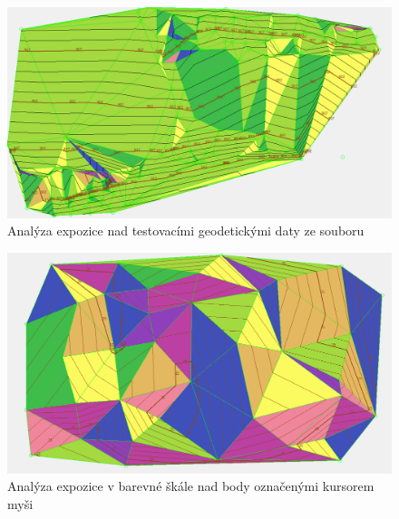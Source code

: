 \documentclass[a4paper,11pt,twoside]{article}
\begin{document}
\begin{figure}[hbt!] 
\begin{center}
\includegraphics[width=13cm]{pictures/data_aspect.PNG} 
\caption[Analýza expozice nad testovacími geodetickými daty ze souboru]{Analýza expozice nad testovacími geodetickými daty ze souboru}
\label{fig:data_aspect}
\end{center}
\end{figure}

\begin{figure}[hbt!] 
\begin{center}
\includegraphics[width=15cm]{pictures/dtm_colorful_aspect.PNG} 
\caption[Analýza expozice v barevné škále nad body označenými kursorem myši]{Analýza expozice v barevné škále nad body označenými kursorem myši}
\label{fig:dtm_colorful_aspect}
\end{center}
\end{figure}
\end{document}
